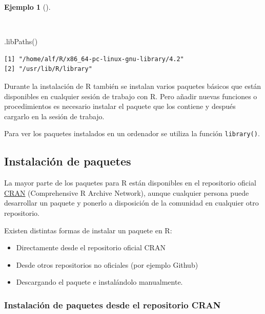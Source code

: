 \documentclass[
  a4paper,
]{scrreport}
\newenvironment{Shaded}{\begin{snugshade}}{\end{snugshade}}
\newcommand{\FunctionTok}[1]{\textcolor[rgb]{0.28,0.35,0.67}{#1}}
\newcommand{\NormalTok}[1]{\textcolor[rgb]{0.00,0.23,0.31}{#1}}
\providecommand{\tightlist}{%
  \setlength{\itemsep}{0pt}\setlength{\parskip}{0pt}}\usepackage{longtable,booktabs,array}
\theoremstyle{definition}
\theoremstyle{definition}
\newtheorem{example}{Ejemplo}[chapter]
\theoremstyle{remark}
\begin{document}
\begin{example}[]\protect\hypertarget{exm-ubiacion-biblioteca-paquetes}{}\label{exm-ubiacion-biblioteca-paquetes}

~

\begin{Shaded}
\begin{Highlighting}[]
\FunctionTok{.libPaths}\NormalTok{()}
\end{Highlighting}
\end{Shaded}

\begin{verbatim}
[1] "/home/alf/R/x86_64-pc-linux-gnu-library/4.2"
[2] "/usr/lib/R/library"                         
\end{verbatim}

\end{example}

Durante la instalación de R también se instalan varios paquetes básicos
que están disponibles en cualquier sesión de trabajo con R. Pero añadir
nuevas funciones o procedimientos es necesario instalar el paquete que
los contiene y después cargarlo en la sesión de trabajo.

Para ver los paquetes instalados en un ordenador se utiliza la función
\texttt{library()}.

\hypertarget{instalaciuxf3n-de-paquetes}{%
\subsection{Instalación de paquetes}\label{instalaciuxf3n-de-paquetes}}

La mayor parte de los paquetes para R están disponibles en el
repositorio oficial
\href{Comprehensive\%20R\%20Archive\%20Network}{CRAN} (Comprehensive R
Archive Network), aunque cualquier persona puede desarrollar un paquete
y ponerlo a disposición de la comunidad en cualquier otro repositorio.

Existen distintas formas de instalar un paquete en R:

\begin{itemize}
\tightlist
\item
  Directamente desde el repositorio oficial CRAN
\item
  Desde otros repositorios no oficiales (por ejemplo Github)
\item
  Descargando el paquete e instalándolo manualmente.
\end{itemize}

\hypertarget{instalaciuxf3n-de-paquetes-desde-el-repositorio-cran}{%
\subsubsection{Instalación de paquetes desde el repositorio
CRAN}\label{instalaciuxf3n-de-paquetes-desde-el-repositorio-cran}}
\end{document}
